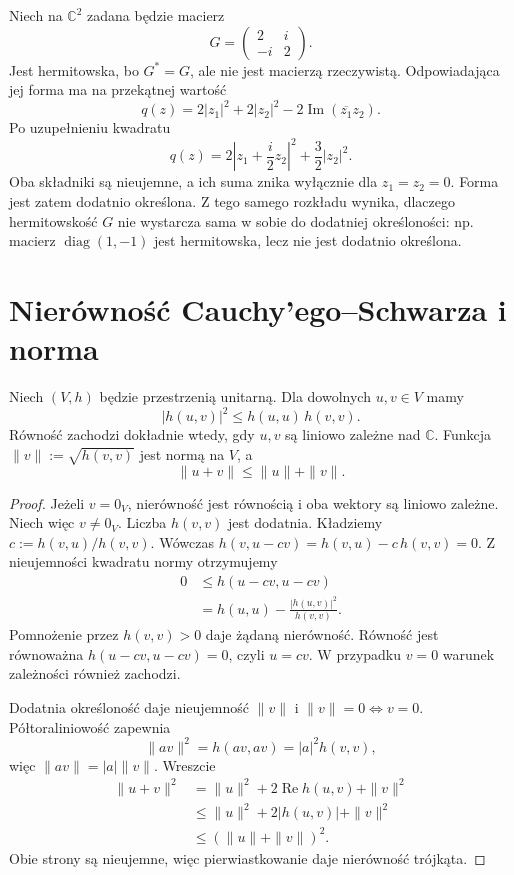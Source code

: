 \begin{przyklad}
\label{prz:lin12-gram-i}
Niech na \(\mathbb C^2\) zadana będzie
macierz
\[
 G=\begin{pmatrix}2&i\\-i&2\end{pmatrix}.
\]
Jest hermitowska, bo \(G^*=G\),
ale nie jest macierzą rzeczywistą.
Odpowiadająca jej forma ma
na przekątnej wartość
\[
 q(z)=2|z_1|^2+2|z_2|^2
       -2\operatorname{Im}(\overline{z_1}z_2).
\]
Po uzupełnieniu kwadratu
\[
 q(z)=2\left|z_1+\frac i2z_2\right|^2
       +\frac32|z_2|^2.
\]
Oba składniki są nieujemne,
a ich suma znika wyłącznie
dla \(z_1=z_2=0\).
Forma jest zatem dodatnio określona.
Z tego samego rozkładu wynika,
dlaczego hermitowskość \(G\)
nie wystarcza sama w sobie
do dodatniej określoności:
np. macierz \(\operatorname{diag}(1,-1)\)
jest hermitowska, lecz nie jest
dodatnio określona.
\end{przyklad}

\section{Nierówność Cauchy'ego--Schwarza i norma}
\label{sec:lin12-norma}

\begin{twierdzenie}
\label{thm:lin12-cauchy-schwarz}
Niech \((V,h)\) będzie przestrzenią unitarną.
Dla dowolnych \(u,v\in V\) mamy
\[
 |h(u,v)|^2\le h(u,u)\,h(v,v).
\]
Równość zachodzi dokładnie wtedy,
gdy \(u,v\) są liniowo zależne nad \(\mathbb C\).
Funkcja
\(\|v\|:=\sqrt{h(v,v)}\)
jest normą na \(V\), a
\[
 \|u+v\|\le\|u\|+\|v\|.
\]
\end{twierdzenie}
\begin{proof}
Jeżeli \(v=0_V\), nierówność
jest równością i oba wektory
są liniowo zależne.
Niech więc \(v\ne0_V\).
Liczba \(h(v,v)\) jest dodatnia.
Kładziemy
\(c:=h(v,u)/h(v,v)\).
Wówczas
\(h(v,u-cv)=h(v,u)-c\,h(v,v)=0\).
Z nieujemności kwadratu normy
otrzymujemy
\[
 \begin{aligned}
 0&\le h(u-cv,u-cv)\\
  &=h(u,u)-\frac{|h(u,v)|^2}{h(v,v)}.
 \end{aligned}
\]
Pomnożenie przez \(h(v,v)>0\)
daje żądaną nierówność.
Równość jest równoważna
\(h(u-cv,u-cv)=0\),
czyli \(u=cv\).
W przypadku \(v=0\)
warunek zależności również zachodzi.

Dodatnia określoność daje
nieujemność \(\|v\|\) i
\(\|v\|=0\iff v=0\).
Półtoraliniowość zapewnia
\[
 \|av\|^2=h(av,av)=|a|^2 h(v,v),
\]
więc \(\|av\|=|a|\|v\|\).
Wreszcie
\[
 \begin{aligned}
 \|u+v\|^2
 &=\|u\|^2+2\operatorname{Re}h(u,v)+\|v\|^2\\
 &\le \|u\|^2+2|h(u,v)|+\|v\|^2\\
 &\le (\|u\|+\|v\|)^2.
 \end{aligned}
\]
Obie strony są nieujemne,
więc pierwiastkowanie daje
nierówność trójkąta.
\end{proof}

